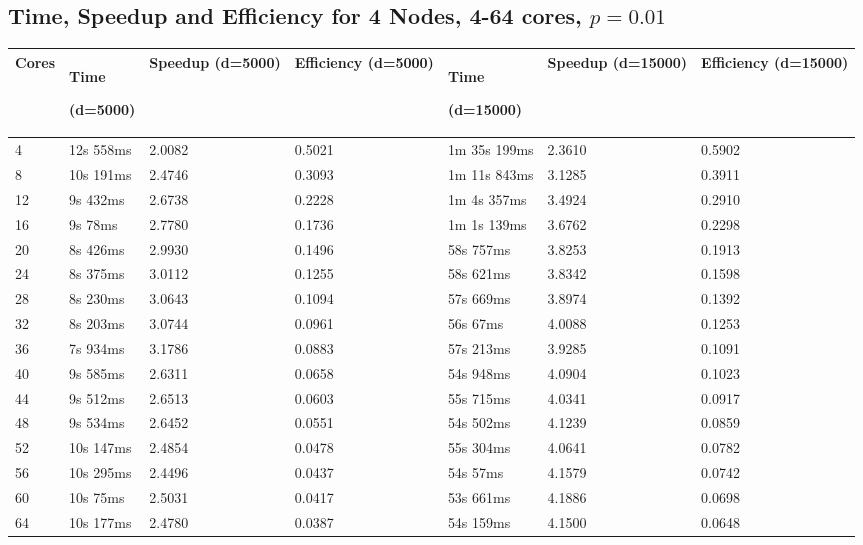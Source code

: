\documentclass[12pt]{article}
\begin{document}
\begin{appendices}
\vspace{-0.5cm}\subsection{Time, Speedup and Efficiency for 4 Nodes, 4-64 cores, $p=0.01$}\vspace{-0.5cm}
\footnotesize{\label{sec:fourNodes}
\begin{center}
\begin{tabular}{|p{1cm}|p{2.5cm}|p{2cm}|p{2cm}|p{2.5cm}|p{2cm}|p{2cm}|}
\hline
Cores	& Time\par(d=5000)	& Speedup (d=5000)	& Efficiency (d=5000)	& Time \par(d=15000)	& Speedup (d=15000)	& Efficiency (d=15000)  \\
\hline
4 &	12s 558ms &	2.0082	 & 0.5021 & 1m 35s 199ms &	2.3610	 & 0.5902 \\
8 &	10s 191ms &	2.4746	 & 0.3093 & 1m 11s 843ms &	3.1285	 & 0.3911 \\
12 &	9s 432ms &	2.6738	 & 0.2228 & 1m 4s 357ms &	3.4924	 & 0.2910 \\
16 &	9s 78ms &	2.7780	 & 0.1736 & 1m 1s 139ms &	3.6762	 & 0.2298 \\
20 &	8s 426ms &	2.9930	 & 0.1496 & 58s 757ms &	3.8253	 & 0.1913 \\
24 &	8s 375ms &	3.0112	 & 0.1255 & 58s 621ms &	3.8342	 & 0.1598 \\
28 &	8s 230ms &	3.0643	 & 0.1094 & 57s 669ms &	3.8974	 & 0.1392 \\
32 &	8s 203ms &	3.0744	 & 0.0961 & 56s 67ms &	4.0088	 & 0.1253 \\
36 &	7s 934ms &	3.1786	 & 0.0883 & 57s 213ms &	3.9285	 & 0.1091 \\
40 &	9s 585ms &	2.6311	 & 0.0658 & 54s 948ms &	4.0904	 & 0.1023 \\
44 &	9s 512ms &	2.6513	 & 0.0603 & 55s 715ms &	4.0341	 & 0.0917 \\
48 &	9s 534ms &	2.6452	 & 0.0551 & 54s 502ms &	4.1239	 & 0.0859 \\
52 &	10s 147ms &	2.4854	 & 0.0478 & 55s 304ms &	4.0641	 & 0.0782 \\
56 &	10s 295ms &	2.4496	 & 0.0437 & 54s 57ms &	4.1579	 & 0.0742 \\
60 &	10s 75ms &	2.5031	 & 0.0417 & 53s 661ms &	4.1886	 & 0.0698 \\
64 &	10s 177ms &	2.4780	 & 0.0387 & 54s 159ms &	4.1500	 & 0.0648 \\
\hline
\end{tabular}
\end{center}}


\end{appendices}
\end{document}
